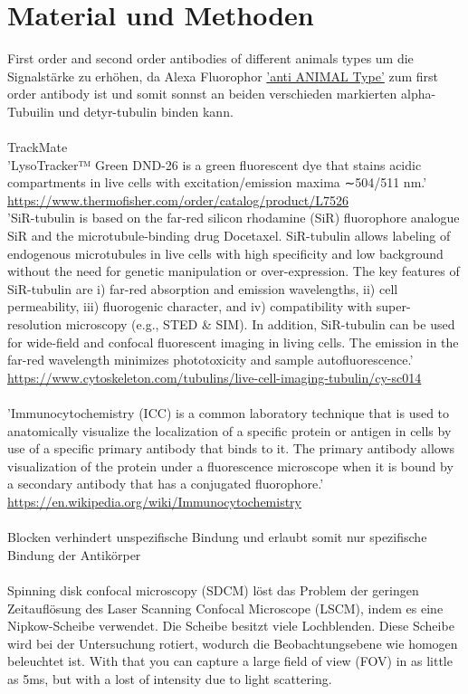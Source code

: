 \section{Material und Methoden}
First order and second order antibodies of different animals types um die Signalstärke zu erhöhen, da Alexa Fluorophor \underline{'anti ANIMAL Type'} zum  first order antibody ist und somit sonnst an beiden verschieden markierten alpha-Tubuilin und detyr-tubulin binden kann.\\\\
TrackMate \cite{Ershov_2021} \cite{Tinevez_2017} \\
'LysoTracker™ Green DND-26 is a green fluorescent dye that stains acidic compartments in live cells with excitation/emission maxima ∼504/511 nm.' \url{https://www.thermofisher.com/order/catalog/product/L7526}
\\
'SiR-tubulin is based on the far-red silicon rhodamine (SiR) fluorophore analogue SiR and the microtubule-binding drug Docetaxel. SiR-tubulin allows labeling of endogenous microtubules in live cells with high specificity and low background without the need for genetic manipulation or over-expression. The key features of SiR-tubulin are i) far-red absorption and emission wavelengths, ii) cell permeability, iii) fluorogenic character, and iv) compatibility with super-resolution microscopy (e.g., STED & SIM). In addition, SiR-tubulin can be used for wide-field and confocal fluorescent imaging in living cells. The emission in the far-red wavelength minimizes phototoxicity and sample autofluorescence.' \url{https://www.cytoskeleton.com/tubulins/live-cell-imaging-tubulin/cy-sc014}
\\\\
'Immunocytochemistry (ICC) is a common laboratory technique that is used to anatomically visualize the localization of a specific protein or antigen in cells by use of a specific primary antibody that binds to it. The primary antibody allows visualization of the protein under a fluorescence microscope when it is bound by a secondary antibody that has a conjugated fluorophore.' \url{https://en.wikipedia.org/wiki/Immunocytochemistry}\\\\
Blocken verhindert unspezifische Bindung und erlaubt somit nur spezifische Bindung der Antikörper \\\\
Spinning disk confocal microscopy (SDCM) löst das Problem der geringen Zeitauflösung des Laser Scanning Confocal Microscope (LSCM), indem es eine Nipkow-Scheibe verwendet. Die Scheibe besitzt viele Lochblenden. Diese Scheibe wird bei der Untersuchung rotiert, wodurch die Beobachtungsebene wie homogen beleuchtet ist. With that you can capture a large field of view (FOV) in as little as 5ms, but with a lost of intensity due to light scattering.

